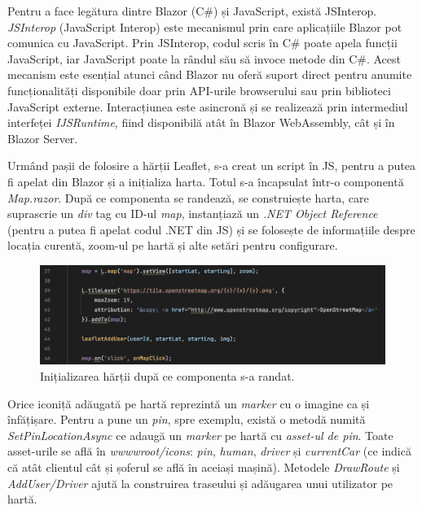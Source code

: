 Pentru a face legătura dintre Blazor (C\#) și JavaScript, există JSInterop. \textit{JSInterop} 
(JavaScript Interop) este mecanismul prin care aplicațiile Blazor pot comunica cu 
JavaScript. Prin JSInterop, codul scris în C\# poate apela funcții JavaScript, iar 
JavaScript poate la rândul său să invoce metode din C\#. Acest mecanism este esențial 
atunci când Blazor nu oferă suport direct pentru anumite funcționalități disponibile 
doar prin API-urile browserului sau prin biblioteci JavaScript externe. Interacțiunea 
este asincronă și se realizează prin intermediul interfeței \textit{IJSRuntime}, fiind 
disponibilă atât în Blazor WebAssembly, cât și în Blazor Server. \parencite{blazor} 

Urmând pașii de folosire a hărții Leaflet, s-a creat un script în JS, pentru a putea fi
apelat din Blazor și a inițializa harta. Totul s-a încapsulat într-o componentă \textit{Map.razor}.
După ce componenta se randează, se construiește harta, care suprascrie un \textit{div} tag cu ID-ul \textit{map}, instanțiază
un \textit{.NET Object Reference} (pentru a putea fi apelat codul .NET din JS) și se folosește de informațiile despre locația curentă, zoom-ul 
pe hartă și alte setări pentru configurare.

\begin{figure}[H]
    \centering
    \includegraphics[width=16cm]{Assets/initLeaflet.png}
    \caption{Inițializarea hărții după ce componenta s-a randat.}
    \label{fig:initLeaflet}
\end{figure}

Orice iconiță adăugată pe hartă reprezintă un \textit{marker} cu o imagine ca și înfățișare. Pentru a pune un \textit{pin}, spre exemplu, există o metodă numită \textit{SetPinLocationAsync} ce adaugă un \textit{marker} pe hartă cu \textit{asset-ul de pin}.
Toate asset-urile se află în \textit{wwwwroot/icons}: \textit{pin}, \textit{human}, \textit{driver} și \textit{currentCar} (ce indică că atât clientul cât și șoferul se află în aceiași mașină).
Metodele \textit{DrawRoute} și \textit{AddUser/Driver} ajută la construirea traseului și adăugarea unui utilizator pe hartă.

